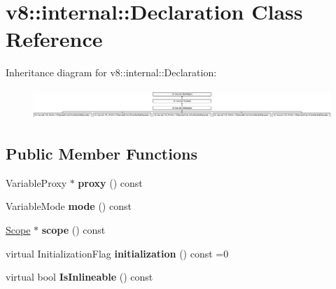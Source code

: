 \hypertarget{classv8_1_1internal_1_1_declaration}{}\section{v8\+:\+:internal\+:\+:Declaration Class Reference}
\label{classv8_1_1internal_1_1_declaration}
Inheritance diagram for v8\+:\+:internal\+:\+:Declaration\+:\begin{figure}[H]
\begin{center}
\leavevmode
\includegraphics[height=1.142857cm]{classv8_1_1internal_1_1_declaration}
\end{center}
\end{figure}
\subsection*{Public Member Functions}
\begin{DoxyCompactItemize}
\item 
\hypertarget{classv8_1_1internal_1_1_declaration_ac38c424c7a06cf9b40743b5596ee738a}{}Variable\+Proxy $\ast$ {\bfseries proxy} () const \label{classv8_1_1internal_1_1_declaration_ac38c424c7a06cf9b40743b5596ee738a}

\item 
\hypertarget{classv8_1_1internal_1_1_declaration_a51759159732384f2d654c3c1127e65aa}{}Variable\+Mode {\bfseries mode} () const \label{classv8_1_1internal_1_1_declaration_a51759159732384f2d654c3c1127e65aa}

\item 
\hypertarget{classv8_1_1internal_1_1_declaration_a28dac848ccf71d6e3dd9392410ebe830}{}\hyperlink{classv8_1_1internal_1_1_scope}{Scope} $\ast$ {\bfseries scope} () const \label{classv8_1_1internal_1_1_declaration_a28dac848ccf71d6e3dd9392410ebe830}

\item 
\hypertarget{classv8_1_1internal_1_1_declaration_aa6dfbbaa640e5902d9ca6f6ced617da9}{}virtual Initialization\+Flag {\bfseries initialization} () const =0\label{classv8_1_1internal_1_1_declaration_aa6dfbbaa640e5902d9ca6f6ced617da9}

\item 
\hypertarget{classv8_1_1internal_1_1_declaration_a3b4b8154ebe29c955b84e28736487973}{}virtual bool {\bfseries Is\+Inlineable} () const \label{classv8_1_1internal_1_1_declaration_a3b4b8154ebe29c955b84e28736487973}

\end{DoxyCompactItemize}
